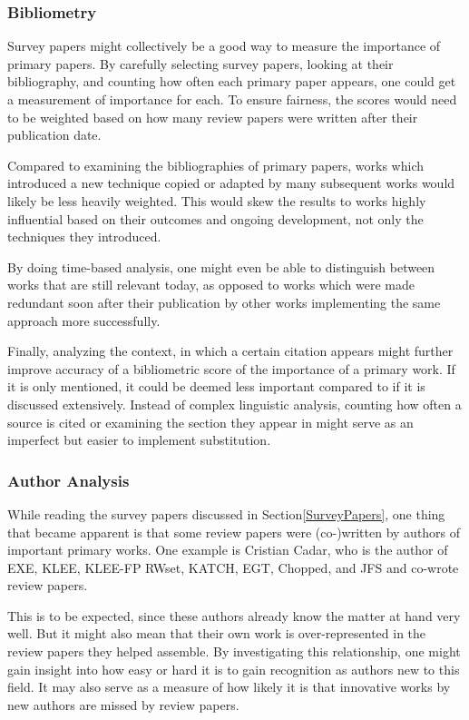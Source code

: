 \documentclass{article}
\begin{document}
\begin{multicols}{2}
  \subsubsection{Bibliometry}
  Survey papers might collectively be a good way to measure the importance of primary papers. By carefully selecting survey papers, looking at their bibliography, and counting how often each primary paper appears, one could get a measurement of importance for each. To ensure fairness, the scores would need to be weighted based on how many review papers were written after their publication date.

  Compared to examining the bibliographies of primary papers, works which introduced a new technique copied or adapted by many subsequent works would likely be less heavily weighted. This would skew the results to works highly influential based on their outcomes and ongoing development, not only the techniques they introduced.

  By doing time-based analysis, one might even be able to distinguish between works that are still relevant today, as opposed to works which were made redundant soon after their publication by other works implementing the same approach more successfully.

  Finally, analyzing the context, in which a certain citation appears might further improve accuracy of a bibliometric score of the importance of a primary work. If it is only mentioned, it could be deemed less important compared to if it is discussed extensively. Instead of complex linguistic analysis, counting how often a source is cited or examining the section they appear in might serve as an imperfect but easier to implement substitution.

  \subsubsection{Author Analysis}
  While reading the survey papers discussed in Section\ref{SurveyPapers}, one thing that became apparent is that some review papers were (co-)written by authors of important primary works. One example is Cristian Cadar, who is the author of EXE\cite{EXE}, KLEE\cite{KLEE}, KLEE-FP\cite{KLEEFP} RWset\cite{RWset}, KATCH\cite{KATCH}, EGT\cite{EGT}, Chopped\cite{Chopped}, and JFS\cite{JFS} and co-wrote review papers\cite{ReviewThreeDecades, ChallengesAndReflections, PreliminaryAssessment}.

  This is to be expected, since these authors already know the matter at hand very well. But it might also mean that their own work is over-represented in the review papers they helped assemble. By investigating this relationship, one might gain insight into how easy or hard it is to gain recognition as authors new to this field. It may also serve as a measure of how likely it is that innovative works by new authors are missed by review papers.


\end{multicols}
\end{document}
